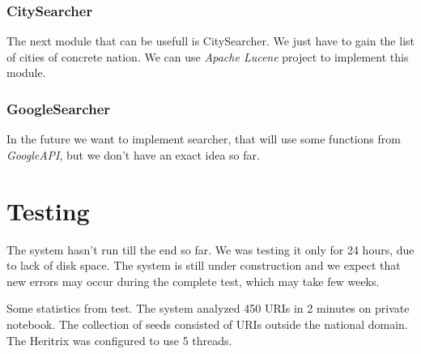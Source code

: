\documentclass[11pt,a4paper]{article}
\begin{document}
\subsubsection*{CitySearcher}
The next module that can be usefull is CitySearcher. We just have to gain the list of cities of concrete nation. We can use \emph{Apache Lucene} project to implement this module.

\subsubsection*{GoogleSearcher}
In the future we want to implement searcher, that will use some functions from \emph{GoogleAPI}, but we don't have an exact idea so far.


\section{Testing}

The system hasn't run till the end so far. We was testing it only for 24 hours, due to lack of disk space. The system is still under construction and we expect that new errors may occur during the complete test, which may take few weeks.

Some statistics from test. The system analyzed 450 URIs in 2 minutes on private notebook. The collection of seeds consisted of URIs outside the national domain. The Heritrix was configured to use 5 threads.
\end{document}
